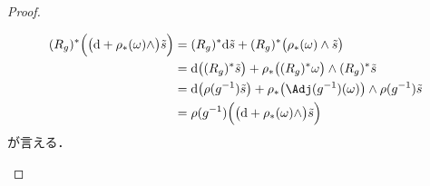 \documentclass[TQFT_main]{subfiles}
\begin{document}
\begin{proof}
\begin{enumerate}
\begin{description}
            \begin{align}
                (R_g)^* \Bigl(\bigl( \dd + \rho_*(\omega) \wedge\bigr) \tilde{s}\Bigr)
                &= (R_g)^*\dd\tilde{s} + (R_g)^* \bigl( \rho_*(\omega) \wedge \tilde{s} \bigr) \\
                &= \dd \bigl( (R_g)^* \tilde{s} \bigr) + \rho_* \bigl( (R_g)^* \omega \bigr) \wedge (R_g)^* \tilde{s} \\
                &= \dd \bigl( \rho(g^{-1})\tilde{s} \bigr) + \rho_* \bigl(\Adj(g^{-1})(\omega)  \bigr) \wedge \rho(g^{-1}) \tilde{s} \\
                &= \rho(g^{-1}) \Bigl( \bigl(\dd + \rho_* (\omega) \wedge\bigr) \tilde{s} \Bigr) 
            \end{align}
            が言える．
        \end{description}
        

\end{enumerate}
\end{proof}
\end{document}
